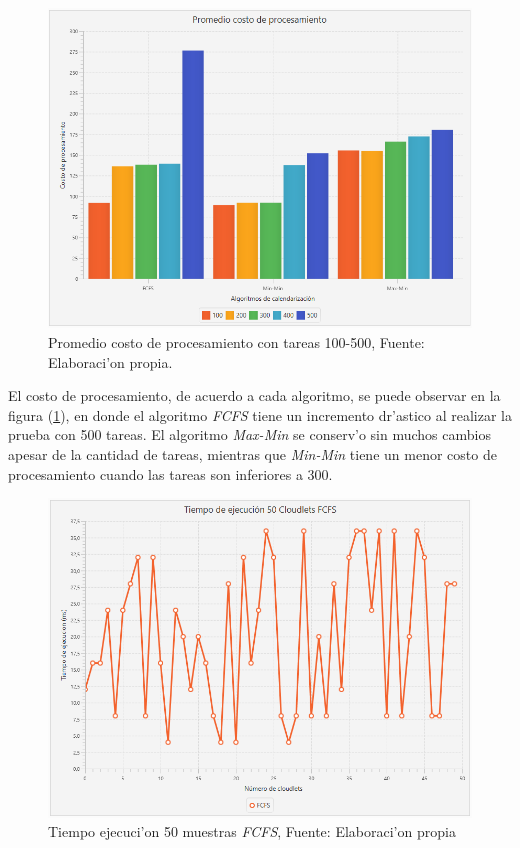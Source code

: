 \newpage
\renewcommand\thefigure{\arabic{figure}}
\begin{figure}[h!] 
	\centering
	\includegraphics[scale=0.5]{media/costoproce}
	\caption{Promedio costo de procesamiento con tareas 100-500, Fuente: Elaboraci'on propia.}
	\label{fig:costo}
\end{figure}


El costo de procesamiento, de acuerdo a cada algoritmo, se puede observar en la figura (\ref{fig:costo}), en donde el algoritmo \textit{FCFS} tiene un incremento dr'astico al realizar la prueba con 500 tareas. El algoritmo \textit{Max-Min} se conserv'o sin muchos cambios apesar de la cantidad de tareas, mientras que \textit{Min-Min} tiene un menor costo de procesamiento cuando las tareas son inferiores a 300.

\newpage

\renewcommand\thefigure{\arabic{figure}}
\begin{figure}[h!] 
	\centering
	\includegraphics[scale=0.5]{media/fcfs}
	\caption{Tiempo ejecuci'on 50 muestras \textit{FCFS}, Fuente: Elaboraci'on propia}
	\label{fig:ejecucion}
\end{figure}


